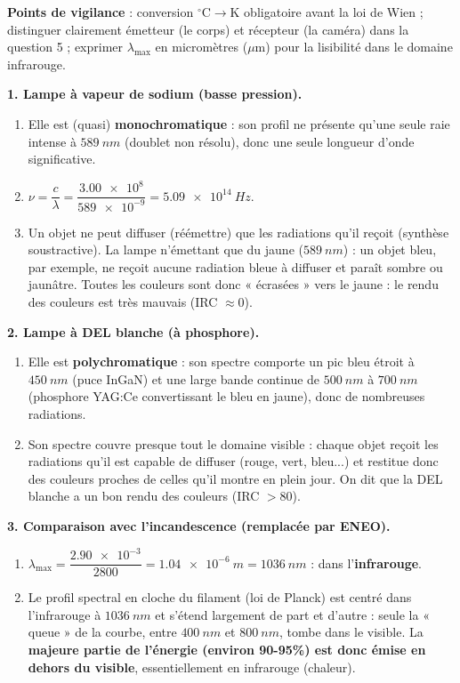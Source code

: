 \documentclass[11pt]{article}
\newcommand{\cle}[1]{{\popxbold\color{popdark}#1}}
\begin{document}
\begin{corrige}
\textbf{Points de vigilance} : conversion $^\circ\text{C} \to \text{K}$ obligatoire avant la loi de Wien ; distinguer clairement \cle{émetteur} (le corps) et \cle{récepteur} (la caméra) dans la question 5 ; exprimer $\lambda_{\max}$ en micromètres ($\mu\text{m}$) pour la lisibilité dans le domaine infrarouge.
\end{corrige}

\begin{corrige}
\textbf{1. Lampe à vapeur de sodium (basse pression).}
\begin{enumerate}
\item Elle est (quasi) \textbf{monochromatique} : son profil ne présente qu'une seule raie intense à $\SI{589}{nm}$ (doublet non résolu), donc une seule longueur d'onde significative.
\item $\nu = \dfrac{c}{\lambda} = \dfrac{\num{3,00e8}}{\num{589e-9}} = \SI{5,09e14}{Hz}$.
\item Un objet ne peut \cle{diffuser} (réémettre) que les radiations qu'il reçoit (\cle{synthèse soustractive}). La lampe n'émettant que du jaune ($\SI{589}{nm}$) : un objet bleu, par exemple, ne reçoit aucune radiation bleue à diffuser et paraît sombre ou jaunâtre. Toutes les couleurs sont donc « écrasées » vers le jaune : le \cle{rendu des couleurs} est très mauvais (IRC $\approx 0$).
\end{enumerate}
\textbf{2. Lampe à DEL blanche (à phosphore).}
\begin{enumerate}
\item Elle est \textbf{polychromatique} : son spectre comporte un pic bleu étroit à $\SI{450}{nm}$ (puce InGaN) et une large bande continue de $\SI{500}{nm}$ à $\SI{700}{nm}$ (phosphore YAG:Ce convertissant le bleu en jaune), donc de nombreuses radiations.
\item Son spectre couvre presque tout le domaine visible : chaque objet reçoit les radiations qu'il est capable de diffuser (rouge, vert, bleu...) et restitue donc des couleurs proches de celles qu'il montre en plein jour. On dit que la DEL blanche a un bon \cle{rendu des couleurs} (IRC $> 80$).
\end{enumerate}
\textbf{3. Comparaison avec l'incandescence (remplacée par ENEO).}
\begin{enumerate}
\item $\lambda_{\max} = \dfrac{\num{2,90e-3}}{2800} = \SI{1,04e-6}{m} = \SI{1036}{nm}$ : dans l'\textbf{infrarouge}.
\item Le profil spectral en cloche du filament (loi de Planck) est centré dans l'infrarouge à $\SI{1036}{nm}$ et s'étend largement de part et d'autre : seule la « queue » de la courbe, entre $\SI{400}{nm}$ et $\SI{800}{nm}$, tombe dans le visible. La \textbf{majeure partie de l'énergie (environ 90-95\%) est donc émise en dehors du visible}, essentiellement en infrarouge (chaleur).

\end{enumerate}
\end{corrige}
\end{document}
